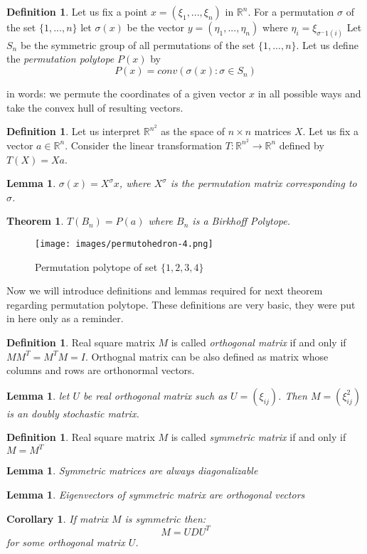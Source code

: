 \documentclass[11pt]{article}
\theoremstyle{plain}
\newtheorem{theorem}[thm]{Theorem}
\newtheorem{lemma}[thm]{Lemma}
\newtheorem{corollary}[thm]{Corollary}
\theoremstyle{definition}
\newtheorem{definition}[thm]{Definition}
\begin{document}
\begin{definition}
    Let us fix a point $x=(\xi_{1},...,\xi_{n})$ in $\mathbb{R}^n$. For a permutation $\sigma$ of the set $\{1,...,n\}$ let $\sigma(x)$ be the vector  $y =(\eta_{1},...,\eta_{n})$ where $\eta_{i} = \xi_{\sigma^-1(i)}$
    Let $S_{n}$ be the symmetric group of all permutations of the set $\{1,...,n\}$. Let us define the \textit{permutation polytope} $P(x)$ by
    $$P(x) = conv(\sigma(x) : \sigma \in S_{n})$$
\end{definition}
in words: we permute the coordinates of a given vector $x$ in all possible ways and take the convex hull of resulting vectors.
\begin{definition}
    Let us interpret $\mathbb{R}^{n^2}$ as the space of $n \times n$ matrices $X$. Let us fix a vector $a \in \mathbb{R}^n$. Consider the linear transformation $T: \mathbb{R}^{n^2} \rightarrow \mathbb{R}^n$ defined by $T(X) = Xa$. 
\end{definition}
\begin{lemma}
    $\sigma(x) = X^\sigma x$, where $X^\sigma$ is the permutation matrix corresponding to $\sigma$.
\end{lemma}
\begin{theorem}
    $T(B_{n}) = P(a)$ where $B_n$ is a Birkhoff Polytope.
\end{theorem}
\begin{figure} 
\caption{Permutation polytope of set $\{1,2,3,4\}$ 
                                                }
\bigskip
\centering
\texttt{[image: images/permutohedron-4.png]}
\end{figure}
Now we will introduce definitions and lemmas required for next theorem regarding permutation polytope. These definitions are very basic, they were put in here only as a reminder. 
\begin{definition}
    Real square matrix $M$ is called \textit{orthogonal matrix} if and only if $MM^T=M^{T}M=I$. Orthognal matrix can be also defined as matrix whose columns and rows are orthonormal vectors.
\end{definition}
\begin{lemma}
    let $U$ be real orthogonal matrix such as $U=(\xi_{ij})$. Then $M = (\xi^{2}_{ij})$ is an doubly stochastic matrix.
\end{lemma}

\begin{definition}
    Real square matrix $M$ is called \textit{symmetric matrix} if and only if $M = M^T$ 
\end{definition}
\begin{lemma}
    Symmetric matrices are always diagonalizable
\end{lemma}
\begin{lemma}
    Eigenvectors of symmetric matrix are orthogonal vectors
\end{lemma}
\begin{corollary}
    If matrix $M$ is symmetric then:
    $$ M = UDU^T$$
    for some orthogonal matrix $U$.
\end{corollary}
\end{document}
